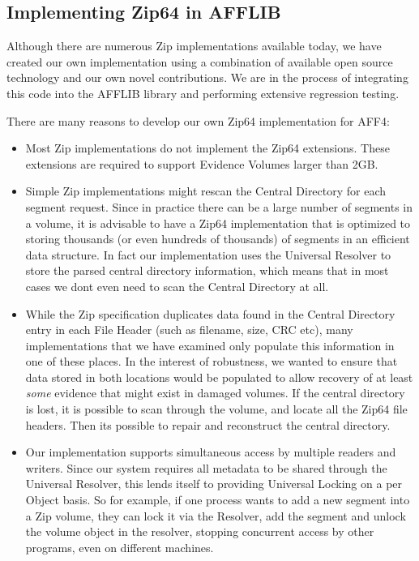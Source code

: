 \documentclass[10pt, conference]{IEEEtran}
\begin{document}
\subsection{Implementing Zip64 in AFFLIB}
Although there are numerous Zip implementations available
today, we have created our own implementation using a combination of
available open source technology and our own novel contributions. We
are in the process of integrating this code into the AFFLIB library
and performing extensive regression testing. 

There are many reasons to develop our own Zip64 implementation for
AFF4:

\begin{itemize}
\item Most Zip implementations do not implement the Zip64
  extensions. These extensions are required to support Evidence
  Volumes larger than 2GB.

\item Simple Zip implementations might rescan the
  Central Directory for each segment request. Since in practice there
  can be a large number of segments in a volume, it is advisable to
  have a Zip64 implementation that is optimized to storing thousands
  (or even hundreds of thousands) of segments in an efficient data
  structure. In fact our implementation uses the Universal Resolver to
  store the parsed central directory information, which means that in
  most cases we dont even need to scan the Central Directory at all.

\item While the Zip specification duplicates data found in the Central
  Directory entry in each File Header (such as filename, size, CRC
  etc), many implementations that we have examined only populate this
  information in one of these places. In the interest of robustness,
  we wanted to ensure that data stored in both locations would be
  populated to allow recovery of at least \emph{some} evidence that
  might exist in damaged volumes. If the central directory is lost, it
  is possible to scan through the volume, and locate all the Zip64
  file headers. Then its possible to repair and reconstruct the
  central directory.

\item Our implementation supports simultaneous access by multiple
  readers and writers. Since our system requires all metadata to be
  shared through the Universal Resolver, this lends itself to
  providing Universal Locking on a per Object basis. So for example,
  if one process wants to add a new segment into a Zip volume, they
  can lock it via the Resolver, add the segment and unlock the volume
  object in the resolver, stopping concurrent access by other
  programs, even on different machines.
\end{itemize}
\end{document}

